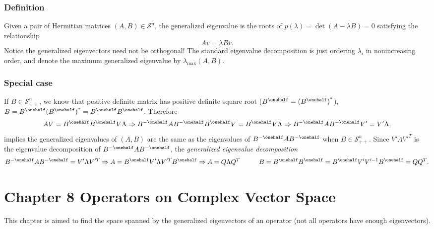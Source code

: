 \subsubsection{Definition} Given a pair of Hermitian matrices $(A, B) \in \mathcal{S}^n$, 
    the generalized eigenvalue is the roots of $p(\lambda)= \det(A-\lambda B)=0$ satisfying the relationship 
    \begin{equation} 
       Av= \lambda Bv.  
    \end{equation} 
    Notice the generalized eigenvectors need not be orthogonal!  
    The standard eigenvalue decomposition is just ordering $\lambda_i$ in nonincreasing order, and denote the maximum generalized eigenvalue by $\lambda_{\max}(A,B)$.  

\subsubsection{Special case} If $B \in \mathcal{S}_{++}^n$, 
    we know that positive definite matrix has positive definite square root 
    ($B^{\onehalf}={(B^{\onehalf})}^{*}$), $B= B^{\onehalf}{(B^{\onehalf})}^{*}= B^{\onehalf}B^{\onehalf}$.  
    Therefore 
    \begin{equation} 
        AV= B^{\onehalf}B^{\onehalf}V \Lambda \Rightarrow B^{-\onehalf}AB^{-\onehalf}B^{\onehalf}V= B^{\onehalf}V \Lambda \Rightarrow B^{-\onehalf}AB^{-\onehalf}V'=V'\Lambda, 
    \end{equation} 
    implies the generalized eigenvalues of $(A,B)$ are the same as the eigenvalues of $B^{-\onehalf}AB^{-\onehalf}$ when $B \in \mathcal{S}_{++}^n$.  
    Since $V' \Lambda V'^T$ is the eigenvalue decomposition of $B^{-\onehalf}AB^{-\onehalf}$, the \emph{generalized eigenvalue decomposition} 
    \begin{equation} 
        B^{-\onehalf}AB^{-\onehalf} = V'\Lambda V'^T \Rightarrow A = 
        B^{\onehalf}V' \Lambda V'^{T}B^{\onehalf} \Rightarrow A = Q \Lambda Q^{T} \hspace{1cm} B = 
        B^{\onehalf}B^{\onehalf}= B^{\onehalf}V'V'^{-1}B^{\onehalf}= QQ^T.  
    \end{equation}


\section{Chapter 8 Operators on Complex Vector Space}

    This chapter is aimed to find the space spanned by the generalized eigenvectors of an operator (not
    all operators have enough eigenvectors). \\

